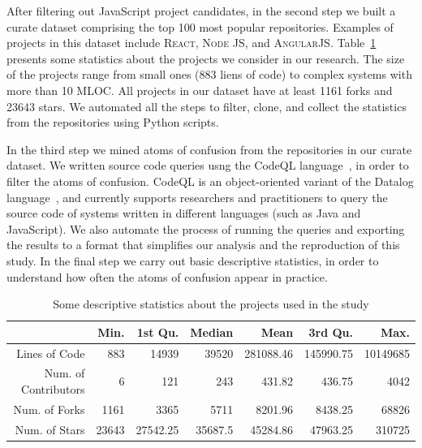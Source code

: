 After filtering out JavaScript project candidates, in the second step we built a curate dataset comprising the top 100 most popular repositories. Examples of projects in this dataset include \textsc{React}, \textsc{Node JS}, and \textsc{AngularJS}. Table~\ref{tab:projects-statistics} presents some statistics about the projects we consider in our research. The size of the projects range from small ones (883 liens of code) to complex systems with more than 10 MLOC. All projects in our dataset have at least \num{1161} forks and \num{23643} stars. We automated all the steps to filter, clone, and collect the statistics from the repositories using Python scripts.

In the third step we mined atoms of confusion from the repositories in our curate dataset. We written source code queries usng the CodeQL language~\cite{moor:gttse2007}, in order to filter the atoms of confusion. CodeQL is an object-oriented variant of the Datalog language~\cite{rodriguez2020efficient}, and currently supports researchers and practitioners to query the source code of systems written in different languages (such as Java and JavaScript). 
We also automate the process of running the queries and exporting the results to a format that simplifies our analysis and the reproduction of this study. In the final step we carry out basic descriptive statistics, in order to understand how often the atoms of confusion appear in practice. 

\begin{table}[ht]
 \centering
 \begin{tabular}{rrrrrrr}
   \hline
             & Min. & 1st Qu. & Median & Mean & 3rd Qu. & Max. \\ \hline
 Lines of Code           & \num{883}  & \num{14939} & \num{39520} & \num{281088.46} & \num{145990.75} & \num{10149685} \\
 Num. of Contributors    & \num{6}   & \num{121} & \num{243} & \num{431.82} & \num{436.75} & \num{4042} \\
 Num. of Forks           & \num{1161}   & \num{3365} & \num{5711} & \num{8201.96} & \num{8438.25} & \num{68826} \\
 Num. of Stars        & \num{23643} & \num{27542.25} & \num{35687.5} & \num{45284.86} & \num{47963.25} & \num{310725} \\
    \hline
 \end{tabular}
 \caption{Some descriptive statistics about the projects used in the study}
 \label{tab:projects-statistics} 
 \end{table}
 
